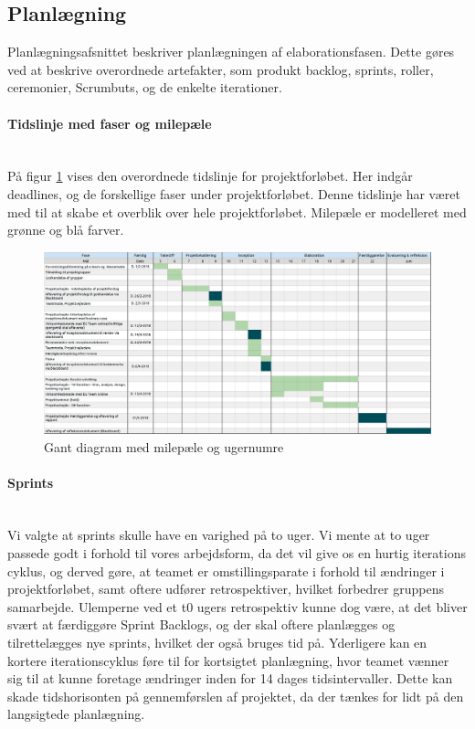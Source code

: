 \documentclass[../../main.tex]{subfiles}
\begin{document}
\subsection{Planlægning}
Planlægningsafsnittet beskriver planlægningen af elaborationsfasen. Dette gøres ved at beskrive overordnede artefakter, som produkt backlog, sprints, roller, ceremonier, Scrumbuts, og de enkelte iterationer.

\paragraph{Tidslinje med faser og milepæle}\mbox{}\\
På figur \ref{fig:tidslinje} vises den overordnede tidslinje for projektforløbet. Her indgår deadlines, og de forskellige faser under projektforløbet. Denne tidslinje har været med til at skabe et overblik over hele projektforløbet. Milepæle er modelleret med grønne og blå farver.

\begin{figure}[H]
  \centering
  \includegraphics[scale=.4]{figurer/milep_l.png}
  \caption{Gant diagram med milepæle og ugernumre}
  \label{fig:tidslinje}
\end{figure}

\paragraph{Sprints}\mbox{}\\
Vi valgte at sprints skulle have en varighed på to uger. Vi mente at to uger passede godt i forhold til vores arbejdsform, da det vil give os en hurtig iterations cyklus, og derved gøre, at teamet er omstillingsparate i forhold til ændringer i projektforløbet, samt oftere udfører retrospektiver, hvilket forbedrer gruppens samarbejde. Ulemperne ved et t0 ugers retrospektiv kunne dog være, at det bliver svært at færdiggøre Sprint Backlogs, og der skal oftere planlægges og tilrettelægges nye sprints, hvilket der også bruges tid på. Yderligere kan en kortere iterationscyklus føre til for kortsigtet planlægning, hvor teamet vænner sig til at kunne foretage ændringer inden for 14 dages tidsintervaller. Dette kan skade tidshorisonten på gennemførslen af projektet, da der tænkes for lidt på den langsigtede planlægning. 
 
\end{document}
